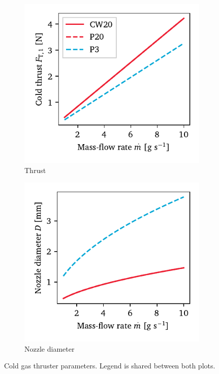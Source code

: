             \begin{figure}[h]
                \centering
                \begin{subfigure}[t]{0.48\textwidth}
                    \centering
                    \includegraphics[width=\textwidth]{assets/4 models/cold_thrust.pdf}
                    \caption{Thrust}
                    \label{fig:cold_thrust_thrust}
                \end{subfigure}
                \hfill
                \begin{subfigure}[t]{0.48\textwidth}
                    \centering
                    \includegraphics[width=\textwidth]{assets/4 models/cold_thrust_nozzle.pdf}
                    \caption{Nozzle diameter}
                    \label{fig:cold_thrust_nozzle}
                \end{subfigure}
                \caption[Cold gas thruster parameters]{Cold gas thruster parameters. Legend is shared between both plots.}
                \label{fig:cold_thrust}
            \end{figure}

